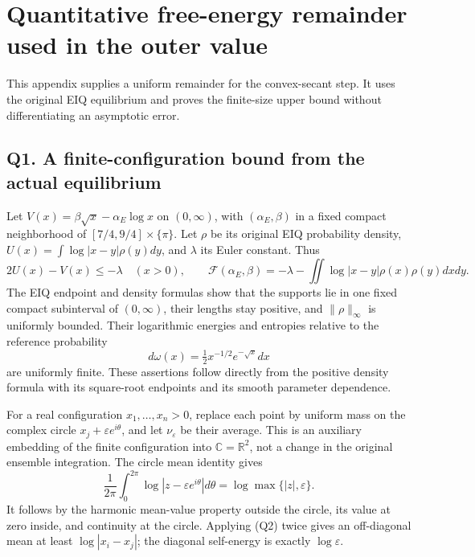 \newpage

\section{Quantitative free-energy remainder used in the outer
value}\label{sa:quantitative-free-energy-remainder-used-in-the-outer-value}

This appendix supplies a uniform remainder for the convex-secant step.
It uses the original EIQ equilibrium and proves the finite-size upper
bound without differentiating an asymptotic error.

\subsection{Q1. A finite-configuration bound from the actual
equilibrium}\label{sa:q1.-a-finite-configuration-bound-from-the-actual-equilibrium}

Let \(V(x)=\beta\sqrt x-\alpha_E\log x\) on \((0,\infty)\), with
\((\alpha_E,\beta)\) in a fixed compact neighborhood of
\([7/4,9/4]\times\{\pi\}\). Let \(\rho\) be its original EIQ probability
density, \(U(x)=\int\log|x-y|\rho(y)dy\), and \(\lambda\) its Euler
constant. Thus \[
2U(x)-V(x)\le-\lambda\quad(x>0),\qquad
\mathcal F(\alpha_E,\beta)=-\lambda-\iint\log|x-y|\rho(x)\rho(y)dxdy.
\tag{Q1}
\] The EIQ endpoint and density formulas show that the supports lie in
one fixed compact subinterval of \((0,\infty)\), their lengths stay
positive, and \(\|\rho\|_\infty\) is uniformly bounded. Their
logarithmic energies and entropies relative to the reference probability
\[
d\omega(x)=\tfrac12x^{-1/2}e^{-\sqrt x}dx
\] are uniformly finite. These assertions follow directly from the
positive density formula with its square-root endpoints and its smooth
parameter dependence.

For a real configuration \(x_1,\ldots,x_n>0\), replace each point by
uniform mass on the complex circle \(x_j+\varepsilon e^{i\theta}\), and
let \(\nu_\varepsilon\) be their average. This is an auxiliary embedding
of the finite configuration into \(\mathbb C=\mathbb R^2\), not a change
in the original ensemble integration. The circle mean identity gives \[
\frac1{2\pi}\int_0^{2\pi}\log|z-\varepsilon e^{i\theta}|d\theta
=\log\max\{|z|,\varepsilon\}.
\tag{Q2}
\] It follows by the harmonic mean-value property outside the circle,
its value at zero inside, and continuity at the circle. Applying (Q2)
twice gives an off-diagonal mean at least \(\log|x_i-x_j|\); the
diagonal self-energy is exactly \(\log\varepsilon\).

